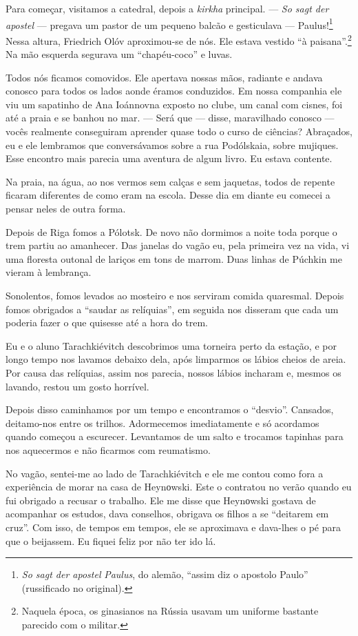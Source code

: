 Para começar, visitamos a catedral, depois a \emph{kirkha} principal.
--- \emph{So sagt der apostel} --- pregava um pastor de um pequeno
balcão e gesticulava --- Paulus!\footnote{\emph{So sagt der apostel}
  \emph{Paulus}, do alemão, ``assim diz o apostolo Paulo'' (russificado
  no original).} Nessa altura, Friedrich Olóv aproximou-se de nós. Ele
estava vestido ``à paisana''.\footnote{Naquela época, os ginasianos na
  Rússia usavam um uniforme bastante parecido com o militar.} Na mão
esquerda segurava um ``chapéu-coco'' e luvas.

Todos nós ficamos comovidos. Ele apertava nossas mãos, radiante e andava
conosco para todos os lados aonde éramos conduzidos. Em nossa companhia
ele viu um sapatinho de Ana Ioánnovna exposto no clube, um canal com
cisnes, foi até a praia e se banhou no mar. --- Será que --- disse,
maravilhado conosco --- vocês realmente conseguiram aprender quase todo
o curso de ciências? Abraçados, eu e ele lembramos que conversávamos
sobre a rua Podólskaia, sobre mujiques. Esse encontro mais parecia uma
aventura de algum livro. Eu estava contente.

Na praia, na água, ao nos vermos sem calças e sem jaquetas, todos de
repente ficaram diferentes de como eram na escola. Desse dia em diante
eu comecei a pensar neles de outra forma.

Depois de Riga fomos a Pólotsk. De novo não dormimos a noite toda porque
o trem partiu ao amanhecer. Das janelas do vagão eu, pela primeira vez
na vida, vi uma floresta outonal de lariços em tons de marrom. Duas
linhas de Púchkin me vieram à lembrança.

Sonolentos, fomos levados ao mosteiro e nos serviram comida quaresmal.
Depois fomos obrigados a ``saudar as relíquias'', em seguida nos
disseram que cada um poderia fazer o que quisesse até a hora do trem.

Eu e o aluno Tarachkiévitch descobrimos uma torneira perto da estação, e
por longo tempo nos lavamos debaixo dela, após limparmos os lábios
cheios de areia. Por causa das relíquias, assim nos parecia, nossos
lábios incharam e, mesmos os lavando, restou um gosto horrível.

Depois disso caminhamos por um tempo e encontramos o ``desvio''.
Cansados, deitamo-nos entre os trilhos. Adormecemos imediatamente e só
acordamos quando começou a escurecer. Levantamos de um salto e trocamos
tapinhas para nos aquecermos e não ficarmos com reumatismo.

No vagão, sentei-me ao lado de Tarachkiévitch e ele me contou como fora
a experiência de morar na casa de Heynоwski. Este o contratou no verão
quando eu fui obrigado a recusar o trabalho. Ele me disse que Heynоwski
gostava de acompanhar os estudos, dava conselhos, obrigava os filhos a
se ``deitarem em cruz''. Com isso, de tempos em tempos, ele se
aproximava e dava-lhes o pé para que o beijassem. Eu fiquei feliz por
não ter ido lá.

